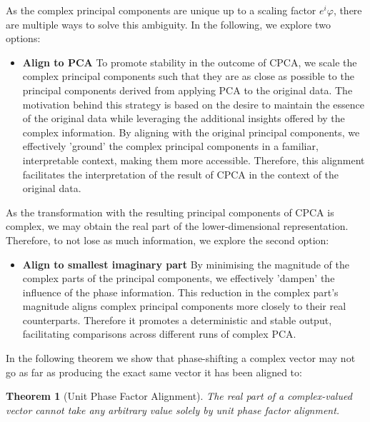 \documentclass[pdftex,12pt,a4paper]{report}
\newtheorem{theorem}[definition]{Theorem}
\begin{document}
As the complex principal components are unique up to a scaling factor $e^i\varphi$, there are multiple ways to solve this ambiguity.
In the following, we explore two options:
\begin{itemize}
    \item \textbf{Align to PCA} To promote stability in the outcome of CPCA, we scale the complex principal components such that they are as close as possible to the principal components derived from applying PCA to the original data.
    The motivation behind this strategy is based on the desire to maintain the essence of the original data while leveraging the additional insights offered by the complex information.
    By aligning with the original principal components, we effectively 'ground' the complex principal components in a familiar, interpretable context, making them more accessible.
    Therefore, this alignment facilitates the interpretation of the result of CPCA in the context of the original data.
\end{itemize}
As the transformation with the resulting principal components of CPCA is complex, we may obtain the real part of the lower-dimensional representation.
Therefore, to not lose as much information, we explore the second option:
\begin{itemize}
    \item \textbf{Align to smallest imaginary part}
    By minimising the magnitude of the complex parts of the principal components, we effectively 'dampen' the influence of the phase information.
    This reduction in the complex part's magnitude aligns complex principal components more closely to their real counterparts.
    Therefore it promotes a deterministic and stable output, facilitating comparisons across different runs of complex PCA.
\end{itemize}

In the following theorem we show that phase-shifting a complex vector may not go as far as producing the exact same vector it has been aligned to:

\begin{theorem}[Unit Phase Factor Alignment] 
    The real part of a complex-valued vector cannot take any arbitrary value solely by unit phase factor alignment.
\end{theorem}
\end{document}
